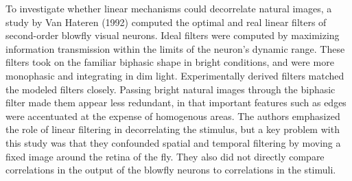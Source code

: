 \documentclass[12pt]{article}
\begin{document}
To investigate whether linear mechanisms could decorrelate natural images, a study by Van Hateren (1992) computed the optimal and real linear filters of second-order blowfly visual neurons. Ideal filters were computed by maximizing information transmission within the limits of the neuron’s dynamic range. These filters took on the familiar biphasic shape in bright conditions, and were more monophasic and integrating in dim light. Experimentally derived filters matched the modeled filters closely. Passing bright natural images through the biphasic filter made them appear less redundant, in that important features such as edges were accentuated at the expense of homogenous areas. The authors emphasized the role of linear filtering in decorrelating the stimulus, but a key problem with this study was that they confounded spatial and temporal filtering by moving a fixed image around the retina of the fly. They also did not directly compare correlations in the output of the blowfly neurons to correlations in the stimuli.
\end{document}
